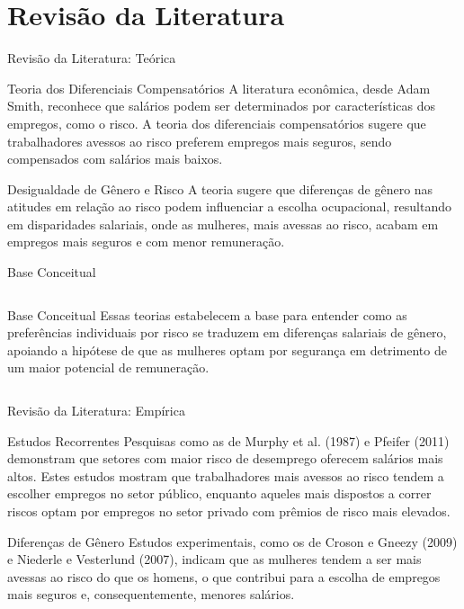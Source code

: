 \documentclass[aspectratio=169, xcolor={dvipsnames}, 10pt, brazil]{beamer}
\begin{document}
\section{Revisão da Literatura}
\begin{frame}{Revisão da Literatura: Teórica}
    \begin{block}{Teoria dos Diferenciais Compensatórios}
        A literatura econômica, desde Adam Smith, reconhece que salários podem ser determinados por características dos empregos, como o risco. A teoria dos diferenciais compensatórios sugere que trabalhadores avessos ao risco preferem empregos mais seguros, sendo compensados com salários mais baixos.
    \end{block}
    
    \vspace{0.5cm}
    
    \begin{block}{Desigualdade de Gênero e Risco}
        A teoria sugere que diferenças de gênero nas atitudes em relação ao risco podem influenciar a escolha ocupacional, resultando em disparidades salariais, onde as mulheres, mais avessas ao risco, acabam em empregos mais seguros e com menor remuneração.
    \end{block}
\end{frame}

\begin{frame}{Base Conceitual}
    \begin{columns}
        \begin{block}{Base Conceitual}
            Essas teorias estabelecem a base para entender como as preferências individuais por risco se traduzem em diferenças salariais de gênero, apoiando a hipótese de que as mulheres optam por segurança em detrimento de um maior potencial de remuneração.
        \end{block}
    \end{columns}
\end{frame}

\begin{frame}{Revisão da Literatura: Empírica}
    \begin{block}{Estudos Recorrentes}
        Pesquisas como as de Murphy et al. (1987) e Pfeifer (2011) demonstram que setores com maior risco de desemprego oferecem salários mais altos. Estes estudos mostram que trabalhadores mais avessos ao risco tendem a escolher empregos no setor público, enquanto aqueles mais dispostos a correr riscos optam por empregos no setor privado com prêmios de risco mais elevados.
    \end{block}
    
    \vspace{0.5cm}
    
    \begin{block}{Diferenças de Gênero}
        Estudos experimentais, como os de Croson e Gneezy (2009) e Niederle e Vesterlund (2007), indicam que as mulheres tendem a ser mais avessas ao risco do que os homens, o que contribui para a escolha de empregos mais seguros e, consequentemente, menores salários.
    \end{block}
\end{frame}
\end{document}
